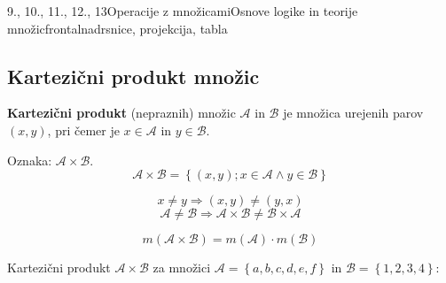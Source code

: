 \begin{priprava}{9., 10., 11., 12., 13}{}{Operacije z množicami}{Osnove logike in teorije množic}{frontalna}{drsnice, projekcija, tabla}
        \subsection{Kartezični produkt množic}
            \textbf{Kartezični produkt} (nepraznih) množic $\mathcal{A}$ in $\mathcal{B}$ je množica 
            urejenih parov $(x,y)$, pri čemer je $x\in\mathcal{A}$ in $y\in\mathcal{B}$.

            Oznaka: $\mathbf{\mathcal{A}\times\mathcal{B}}$.
            $$ \mathcal{A}\times\mathcal{B}=\left\{(x,y); x\in\mathcal{A}\land y\in\mathcal{B}\right\} $$
        

        
            $$x\neq y \Rightarrow (x,y)\neq(y,x)$$
            $$\mathcal{A}\neq\mathcal{B}\Rightarrow \mathcal{A}\times\mathcal{B}\neq\mathcal{B}\times\mathcal{A}$$
        
    
            $$m(\mathcal{A}\times\mathcal{B})=m(\mathcal{A})\cdot m(\mathcal{B}) $$
        \newline

              Kartezični produkt $\mathcal{A}\times\mathcal{B}$ za množici $ \mathcal{A}=\left\{a,b,c,d,e,f\right\}$ in
              $ \mathcal{B}=\left\{1,2,3,4\right\}$:

            \begin{figure}[H]  
                \centering                   
            \end{figure}


\end{priprava}
